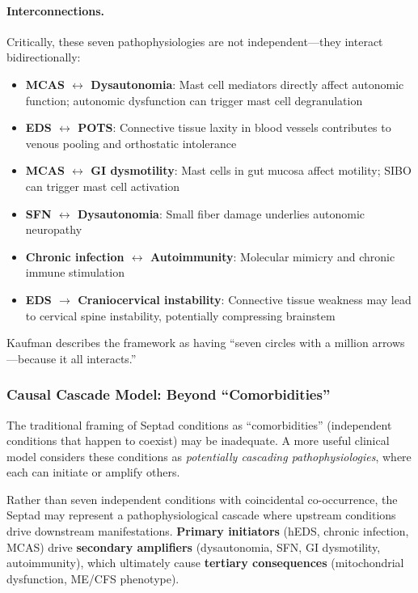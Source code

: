 \paragraph{Interconnections.}
Critically, these seven pathophysiologies are not independent---they interact bidirectionally:

\begin{itemize}
    \item \textbf{MCAS $\leftrightarrow$ Dysautonomia}: Mast cell mediators directly affect autonomic function; autonomic dysfunction can trigger mast cell degranulation
    \item \textbf{EDS $\leftrightarrow$ POTS}: Connective tissue laxity in blood vessels contributes to venous pooling and orthostatic intolerance
    \item \textbf{MCAS $\leftrightarrow$ GI dysmotility}: Mast cells in gut mucosa affect motility; SIBO can trigger mast cell activation
    \item \textbf{SFN $\leftrightarrow$ Dysautonomia}: Small fiber damage underlies autonomic neuropathy
    \item \textbf{Chronic infection $\leftrightarrow$ Autoimmunity}: Molecular mimicry and chronic immune stimulation
    \item \textbf{EDS $\rightarrow$ Craniocervical instability}: Connective tissue weakness may lead to cervical spine instability, potentially compressing brainstem~\cite{Bragee2020,Lohkamp2022}
\end{itemize}

Kaufman describes the framework as having ``seven circles with a million arrows---because it all interacts.''

\subsubsection{Causal Cascade Model: Beyond ``Comorbidities''}
\label{sec:septad-cascades}

The traditional framing of Septad conditions as ``comorbidities'' (independent conditions that happen to coexist) may be inadequate. A more useful clinical model considers these conditions as \textit{potentially cascading pathophysiologies}, where each can initiate or amplify others.

\begin{hypothesis}
\label{hyp:septad-cascade}
Rather than seven independent conditions with coincidental co-occurrence, the Septad may represent a pathophysiological cascade where upstream conditions drive downstream manifestations. \textbf{Primary initiators} (hEDS, chronic infection, MCAS) drive \textbf{secondary amplifiers} (dysautonomia, SFN, GI dysmotility, autoimmunity), which ultimately cause \textbf{tertiary consequences} (mitochondrial dysfunction, ME/CFS phenotype).
\end{hypothesis}

